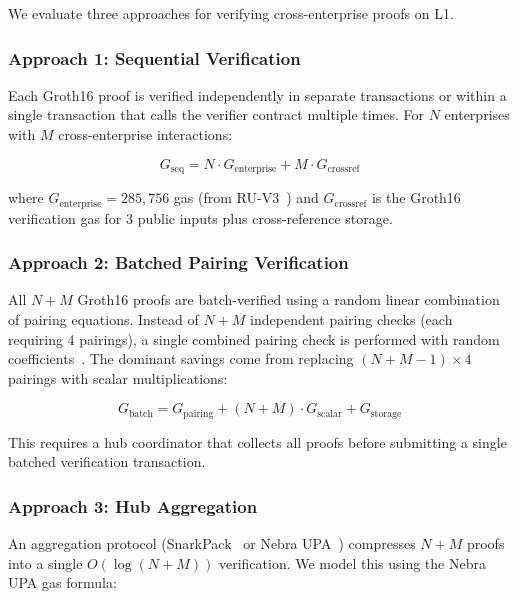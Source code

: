 We evaluate three approaches for verifying cross-enterprise proofs on L1.

\subsubsection{Approach 1: Sequential Verification}

Each Groth16 proof is verified independently in separate transactions or
within a single transaction that calls the verifier contract multiple times.
For $N$ enterprises with $M$ cross-enterprise interactions:

\begin{equation}
G_\text{seq} = N \cdot G_\text{enterprise} + M \cdot G_\text{crossref}
\end{equation}

where $G_\text{enterprise} = 285{,}756$ gas (from RU-V3~\cite{ruv3gas}) and
$G_\text{crossref}$ is the Groth16 verification gas for 3 public inputs plus
cross-reference storage.

\subsubsection{Approach 2: Batched Pairing Verification}

All $N + M$ Groth16 proofs are batch-verified using a random linear
combination of pairing equations. Instead of $N + M$ independent pairing
checks (each requiring 4 pairings), a single combined pairing check is
performed with random coefficients~\cite{bellare1998batchrsa}. The dominant
savings come from replacing $(N + M - 1) \times 4$ pairings with scalar
multiplications:

\begin{equation}
G_\text{batch} = G_\text{pairing} + (N + M) \cdot G_\text{scalar} + G_\text{storage}
\end{equation}

This requires a hub coordinator that collects all proofs before submitting a
single batched verification transaction.

\subsubsection{Approach 3: Hub Aggregation}

An aggregation protocol (SnarkPack~\cite{gailly2022snarkpack} or Nebra
UPA~\cite{nebra2024upa}) compresses $N + M$ proofs into a single $O(\log(N+M))$
verification. We model this using the Nebra UPA gas formula:

